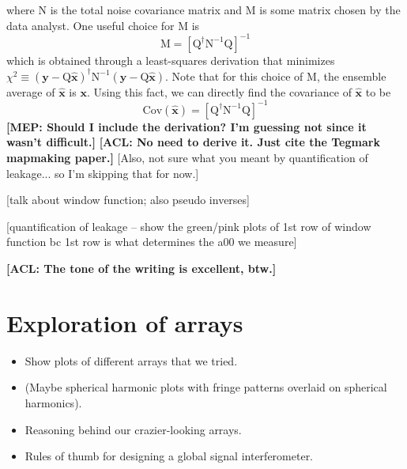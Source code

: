 \documentclass[twolcolumn,apj]{emulateapj}
\newcommand{\acl}[1]{{\color{red} \textbf{[ACL:  #1]}}}
\newcommand{\mep}[1]{{\color{blue} \textbf{[MEP:  #1]}}}
\begin{document}
where N is the total noise covariance matrix and M is some matrix chosen by the data analyst. One useful choice for M is 
\begin{equation}
\textrm{M} = [\textrm{Q}^\dagger \textrm{N}^{-1} \textrm{Q}]^{-1}
\end{equation}
which is obtained through a least-squares derivation that minimizes $\chi^2 \equiv (\mathbf{y}-\textrm{Q} \mathbf{\hat x})^\dagger \textrm{N}^{-1} (\mathbf{y}-\textrm{Q} \mathbf{\hat x})$. Note that for this choice of M, the ensemble average of $\mathbf{\hat x}$ is $\mathbf{x}$.
Using this fact, we can directly find the covariance of $\mathbf{\hat x}$ to be 
\begin{equation}
\textrm{Cov}(\mathbf{\hat x}) = [\textrm{Q}^\dagger \textrm{N}^{-1} \textrm{Q}]^{-1}
\end{equation}
\mep{Should I include the derivation? I'm guessing not since it wasn't difficult.} \acl{No need to derive it.  Just cite the Tegmark mapmaking paper.} [Also, not sure what you meant by quantification of leakage... so I'm skipping that for now.]

[talk about window function; also pseudo inverses]

[quantification of leakage -- show the green/pink plots of 1st row of window function bc 1st row is what determines the a00 we measure]

\acl{The tone of the writing is excellent, btw.}

\section{Exploration of arrays}
\begin{itemize}
\item Show plots of different arrays that we tried.
\item (Maybe spherical harmonic plots with fringe patterns overlaid on spherical harmonics).
\item Reasoning behind our crazier-looking arrays.
\item Rules of thumb for designing a global signal interferometer.
\end{itemize}
\end{document}
